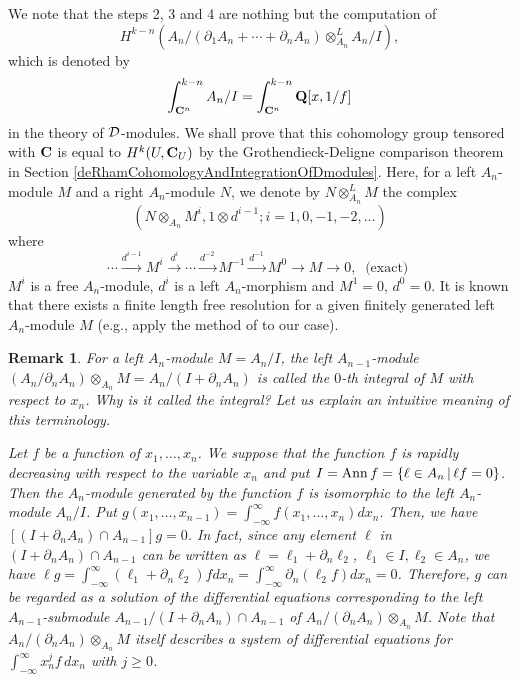 \documentclass[12pt]{article}
\def\Ann{ {\rm Ann}\, }
\def\pd#1{ \partial_{#1} }
\def\C{{\bf C}}
\def\Q{{\bf Q}}
\newtheorem{remark}{Remark}[section]
\begin{document}
We note that the steps 2, 3 and 4 are nothing but the computation of
$$ H^{k-n}(A_n/(\pd{1} A_n + \cdots + \pd{n} A_n) \otimes_{A_n}^{L}
           A_n/I),
$$
which is denoted by 
$$ \int^{k-n}_{\C^n} A_n/I   = \int_{\C^n}^{k-n} \Q[x,1/f]
$$ 
in the theory of ${\cal D}$-modules.
We shall prove that this cohomology group tensored with $\C$ is equal to
$H^k(U,\C_U)$ by the Grothendieck-Deligne comparison theorem
in Section \ref{deRhamCohomologyAndIntegrationOfDmodules}.
Here, for a left $A_n$-module $M$ and a right $A_n$-module $N$, 
we denote by $N \otimes_{A_n}^{L} M$  the complex
$$ ( N \otimes_{A_n} M^i , 1 \otimes d^{i-1} ; i=1, 0, -1, -2, \ldots ) $$
where
$$   \cdots \stackrel{d^{i-1}}{\longrightarrow} M^i
            \stackrel{d^{i}}{\longrightarrow}  \cdots
            \stackrel{d^{-2}}{\longrightarrow}  M^{-1}
            \stackrel{d^{-1}}{\longrightarrow}  M^{0}
            \longrightarrow M \longrightarrow 0, \  
   \mbox{ (exact) }
$$
$M^i$ is a free $A_n$-module, $d^i$ is a left $A_n$-morphism
and
$M^1 = 0$, $d^0 = 0$.
It is known that there exists a finite length free resolution
for a given finitely generated left $A_n$-module $M$
(e.g., apply the method of \cite[p.336 Corollary 15.11]{EisenbudBook}
to our case).



\begin{remark} \rm
For a left $A_n$-module $M=A_n/I$,
the left $A_{n-1}$-module
$(A_n/\pd{n} A_n) \otimes_{A_n} M = A_n/(I+\pd{n}A_n)$
is called the $0$-th integral of $M$ with respect to $x_n$.
Why is it called the integral?
Let us explain an intuitive meaning of this terminology.

Let $f$ be a function of $x_1, \ldots, x_n$.
We suppose that the function $f$ is rapidly decreasing with respect
to the variable $x_n$ and put
$I = \Ann f = \{ \ell \in A_n \,|\, \ell f = 0 \}$.
Then the $A_n$-module generated by the function $f$ is isomorphic
to the left $A_n$-module $A_n/I$.
Put
$ g(x_1, \ldots, x_{n-1}) = \int_{-\infty}^\infty f(x_1, \ldots, x_n) dx_n$.
Then, we have
$ [(I + \pd{n} A_n) \cap A_{n-1}] g = 0 $.
In fact, since any element $\ell$ in $(I+\pd{n}A_n) \cap A_{n-1}$
can be written as
$ \ell = \ell_1 + \pd{n} \ell_2$,
$ \ell_1 \in I,  \ell_2 \in A_n$,
we have
$ \ell g = \int_{-\infty}^\infty (\ell_1 + \pd{n} \ell_2) f dx_n
 = \int_{-\infty}^\infty \pd{n}(\ell_2 f) dx_n = 0$.
Therefore, $g$ can be regarded as a solution of the differential equations 
corresponding to the left $A_{n-1}$-submodule 
$A_{n-1}/(I+\pd{n}A_n)\cap A_{n-1}$ of
$A_n/(\pd{n} A_n) \otimes_{A_n} M$.
Note that $A_n/(\pd{n} A_n) \otimes_{A_n} M$ itself describes a system of 
differential equations for 
$\int_{-\infty}^\infty x_n^j f\,dx_n$ with $j \geq 0$.  
\end{remark}
\end{document}
